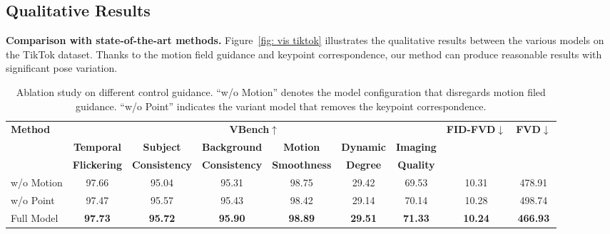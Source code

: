\subsection{Qualitative Results}
\textbf{Comparison with state-of-the-art methods.}
Figure~\ref{fig: vis tiktok} illustrates the qualitative results between the various models on the TikTok dataset. Thanks to the motion field guidance and keypoint correspondence, our method can produce reasonable results with significant pose variation.

\begin{table}[t]
\caption{Ablation study on different control guidance. ``w/o Motion'' denotes the model configuration that disregards motion filed guidance. ``w/o Point'' indicates the variant model that removes the keypoint correspondence.}
\vspace{5pt}
\scriptsize
\centering
\setlength{\tabcolsep}{4pt}
\begin{tabular}{lcccccccc}
\toprule		
\multirow{3}{*}{\textbf{Method}} & \multicolumn{6}{c}{\textbf{VBench}$\uparrow$} & \multirow{3}{*}{\textbf{FID-FVD}$\downarrow$} & \multirow{3}{*}{\textbf{FVD}$\downarrow$} \\ \cmidrule{2-7}
                        & \textbf{Temporal}   & \textbf{Subject}      & \textbf{Background} & \textbf{Motion} & \textbf{Dynamic} & \textbf{Imaging} \\
                        & \textbf{Flickering}     & \textbf{Consistency}  & \textbf{Consistency} & \textbf{Smoothness} & \textbf{Degree} & \textbf{Quality} \\
\midrule
w/o Motion & 97.66 & 95.04 & 95.31 & 98.75 & 29.42 & 69.53 & 10.31 & 478.91\\
w/o Point & 97.47 & 95.57 & 95.43 & 98.42 & 29.14 & 70.14 & 10.28 & 498.74\\
\rowcolor{aliceblue!60}
Full Model & \textbf{97.73} & \textbf{95.72} & \textbf{95.90} & \textbf{98.89} & \textbf{29.51} & \textbf{71.33} & \textbf{10.24} & \textbf{466.93} \\
\bottomrule
\end{tabular}
\label{tab: abs}
\end{table}

